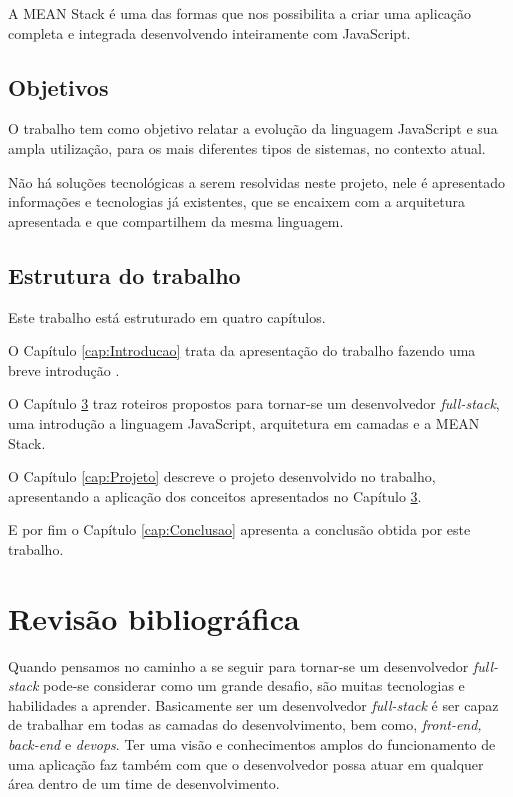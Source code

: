 \documentclass[
	12pt,				%
	openright,			%
	twoside,			%
	a4paper,			%
	english,			%
	brazil				%
	]{abntex2}
\begin{document}
A MEAN Stack é uma das formas que nos possibilita a criar uma aplicação completa e integrada desenvolvendo inteiramente com JavaScript.

\section{Objetivos}

O trabalho tem como objetivo relatar a evolução da linguagem JavaScript e sua ampla utilização, para os mais diferentes tipos de sistemas, no contexto atual.

Não há soluções tecnológicas a serem resolvidas neste projeto, nele é apresentado informações e tecnologias já existentes, que se encaixem com a arquitetura apresentada e que compartilhem da mesma linguagem.

\section{Estrutura do trabalho}

Este trabalho está estruturado em quatro capítulos.

O Capítulo \ref{cap:Introducao} trata da apresentação do trabalho fazendo uma breve introdução .

O Capítulo \ref{cap:RevisaoBibliografica} traz roteiros propostos para tornar-se um desenvolvedor \textit{full-stack}, uma introdução a linguagem JavaScript, arquitetura em camadas e a MEAN Stack.

O Capítulo \ref{cap:Projeto} descreve o projeto desenvolvido no trabalho, apresentando a aplicação dos conceitos apresentados no Capítulo \ref{cap:RevisaoBibliografica}.

E por fim o Capítulo \ref{cap:Conclusao} apresenta a conclusão obtida por este trabalho.

\chapter{Revisão bibliográfica}
\label{cap:RevisaoBibliografica}

Quando pensamos no caminho a se seguir para tornar-se um desenvolvedor \textit{full-stack} pode-se considerar como um grande desafio, são muitas tecnologias e habilidades a aprender. Basicamente ser um desenvolvedor \textit{full-stack} é ser capaz de trabalhar em todas as camadas do desenvolvimento, bem como, \textit{front-end, back-end} e \textit{devops}. Ter uma visão e conhecimentos amplos do funcionamento de uma aplicação faz também com que o desenvolvedor possa atuar em qualquer área dentro de um time de desenvolvimento.
\end{document}
